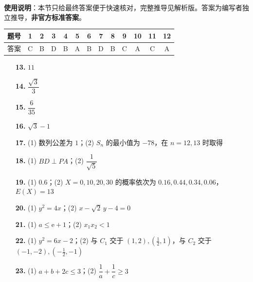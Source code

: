 
\begin{gknotice}
\textbf{使用说明}：本节只给最终答案便于快速核对，完整推导见解析版。答案为编写者独立推导，\textbf{非官方标准答案}。
\end{gknotice}

\begin{center}\begin{tabular}{ccccccccccccc}
\toprule
题号 & 1 & 2 & 3 & 4 & 5 & 6 & 7 & 8 & 9 & 10 & 11 & 12 \\
\midrule
答案 & C & B & D & B & A & B & D & B & C & A & C & A \\
\bottomrule
\end{tabular}\end{center}

\begin{itemize}[leftmargin=2.6em]
  \item[\textbf{13.}] $11$
  \item[\textbf{14.}] $\dfrac{\sqrt3}{3}$
  \item[\textbf{15.}] $\dfrac6{35}$
  \item[\textbf{16.}] $\sqrt3-1$
\end{itemize}

\begin{itemize}[leftmargin=2.6em]
  \item[\textbf{17.}] (1) 数列公差为 $1$；(2) $S_n$ 的最小值为 $-78$，在 $n=12,13$ 时取得
  \item[\textbf{18.}] (1) $BD\perp PA$；(2) $\dfrac1{\sqrt5}$
  \item[\textbf{19.}] (1) $0.6$；(2) $X=0,10,20,30$ 的概率依次为 $0.16,0.44,0.34,0.06$，$E(X)=13$
  \item[\textbf{20.}] (1) $y^2=4x$；(2) $x-\sqrt2\,y-4=0$
  \item[\textbf{21.}] (1) $a\le \mathrm e+1$；(2) $x_1x_2<1$
\end{itemize}

\begin{itemize}[leftmargin=2.6em]
  \item[\textbf{22.}] (1) $y^2=6x-2$；(2) 与 $C_1$ 交于 $(1,2),(\tfrac12,1)$，与 $C_2$ 交于 $(-1,-2),(-\tfrac12,-1)$
  \item[\textbf{23.}] (1) $a+b+2c\le3$；(2) $\dfrac1a+\dfrac1c\ge3$
\end{itemize}
